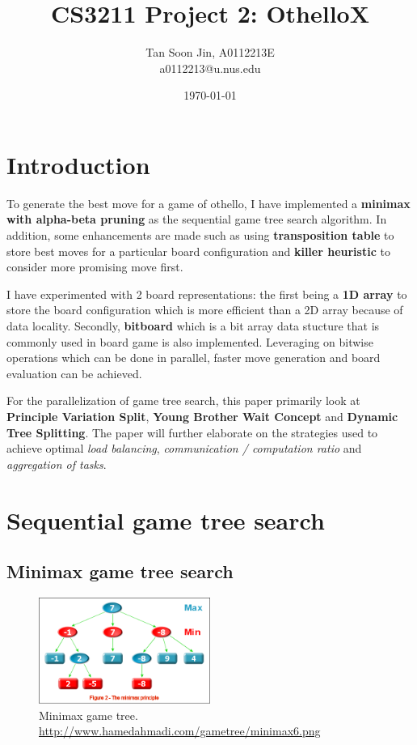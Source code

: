 \documentclass[12pt]{article}
\title{CS3211 Project 2: OthelloX}
\author{Tan Soon Jin, A0112213E \\ a0112213@u.nus.edu}
\date{\today}
\begin{document}
\maketitle


\section{Introduction}

To generate the best move for a game of othello, I have implemented a \textbf{minimax
with alpha-beta pruning} as the sequential game tree search algorithm. In
addition, some enhancements are made such as using \textbf{transposition table} to store
best moves for a particular board configuration and \textbf{killer heuristic} to
consider more promising move first.

I have experimented with 2 board representations: the first being a \textbf{1D array} to
store the board configuration which is more efficient than a 2D array because of
data locality. Secondly, \textbf{bitboard} which is a bit array data stucture
that is commonly used in board game is also implemented. Leveraging on bitwise
operations which can be done in parallel, faster move generation and board
evaluation can be achieved.

For the parallelization of game tree search, this paper primarily look at
\textbf{Principle Variation Split}, \textbf{Young Brother Wait Concept} and
\textbf{Dynamic Tree Splitting}. The paper will further elaborate on the
strategies used to achieve optimal \textit{load balancing},
\textit{communication / computation ratio} and \textit{aggregation of tasks}.




\section{Sequential game tree search}

\subsection{Minimax game tree search}

\begin{figure}[H]
  \centering
  \includegraphics[width=0.5\textwidth, height=0.3\textwidth]{minimax.png}
  \caption{Minimax game tree. \href{}{http://www.hamedahmadi.com/gametree/minimax6.png}}
  \label{fig:minimax}
\end{figure}
\end{document}
